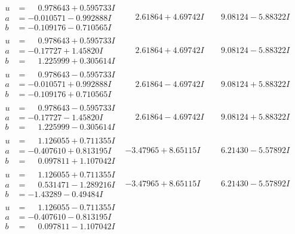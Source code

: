 \documentclass[1p]{elsarticle_modified}
\theoremstyle{definition}
\begin{document}
$$\begin{array}{c|c|c}
\begin{aligned}
u &= \phantom{-}0.978643 + 0.595733 I \\
a &= -0.010571 - 0.992888 I \\
b &= -0.109176 - 0.710565 I\end{aligned}
 & \phantom{-}2.61864 + 4.69742 I & \phantom{-}9.08124 - 5.88322 I \\ \hline\begin{aligned}
u &= \phantom{-}0.978643 + 0.595733 I \\
a &= -0.17727 + 1.45820 I \\
b &= \phantom{-}1.225999 + 0.305614 I\end{aligned}
 & \phantom{-}2.61864 + 4.69742 I & \phantom{-}9.08124 - 5.88322 I \\ \hline\begin{aligned}
u &= \phantom{-}0.978643 - 0.595733 I \\
a &= -0.010571 + 0.992888 I \\
b &= -0.109176 + 0.710565 I\end{aligned}
 & \phantom{-}2.61864 - 4.69742 I & \phantom{-}9.08124 + 5.88322 I \\ \hline\begin{aligned}
u &= \phantom{-}0.978643 - 0.595733 I \\
a &= -0.17727 - 1.45820 I \\
b &= \phantom{-}1.225999 - 0.305614 I\end{aligned}
 & \phantom{-}2.61864 - 4.69742 I & \phantom{-}9.08124 + 5.88322 I \\ \hline\begin{aligned}
u &= \phantom{-}1.126055 + 0.711355 I \\
a &= -0.407610 + 0.813195 I \\
b &= \phantom{-}0.097811 + 1.107042 I\end{aligned}
 & -3.47965 + 8.65115 I & \phantom{-}6.21430 - 5.57892 I \\ \hline\begin{aligned}
u &= \phantom{-}1.126055 + 0.711355 I \\
a &= \phantom{-}0.531471 - 1.289216 I \\
b &= -1.43289 - 0.49484 I\end{aligned}
 & -3.47965 + 8.65115 I & \phantom{-}6.21430 - 5.57892 I \\ \hline\begin{aligned}
u &= \phantom{-}1.126055 - 0.711355 I \\
a &= -0.407610 - 0.813195 I \\
b &= \phantom{-}0.097811 - 1.107042 I\end{aligned}

\end{array}$$
\end{document}
